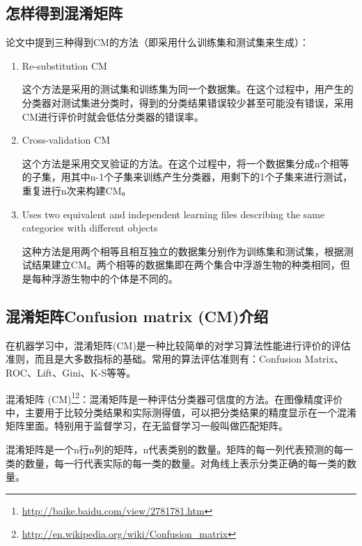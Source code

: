 \documentclass[12pt]{article}
\begin{document}
\subsection{怎样得到混淆矩阵}
论文中提到三种得到CM的方法（即采用什么训练集和测试集来生成）：
    \begin{enumerate}
        \item Re-substitution CM
        
       这个方法是采用的测试集和训练集为同一个数据集。在这个过程中，用产生的分类器对测试集进分类时，得到的分类结果错误较少甚至可能没有错误，采用CM进行评价时就会低估分类器的错误率。
        \item Cross-validation CM
        
        这个方法是采用交叉验证的方法。在这个过程中，将一个数据集分成n个相等的子集，用其中n-1个子集来训练产生分类器，用剩下的1个子集来进行测试，重复进行n次来构建CM。
        \item Uses two equivalent and independent learning files describing the same categories with different objects
        
        这种方法是用两个相等且相互独立的数据集分别作为训练集和测试集，根据测试结果建立CM。两个相等的数据集即在两个集合中浮游生物的种类相同，但是每种浮游生物中的个体是不同的。
    \end{enumerate}
    



\subsection{混淆矩阵Confusion matrix (CM)介绍}
\label{CM}

在机器学习中，混淆矩阵(CM)是一种比较简单的对学习算法性能进行评价的评估准则，而且是大多数指标的基础。常用的算法评估准则有：Confusion Matrix、ROC、Lift、Gini、K-S等等。\newline

混淆矩阵 (CM)\footnote{\url{http://baike.baidu.com/view/2781781.htm}}\footnote{\url{http://en.wikipedia.org/wiki/Confusion_matrix}}：混淆矩阵是一种评估分类器可信度的方法。在图像精度评价中，主要用于比较分类结果和实际测得值，可以把分类结果的精度显示在一个混淆矩阵里面。特别用于监督学习，在无监督学习一般叫做匹配矩阵。

混淆矩阵是一个n行n列的矩阵，n代表类别的数量。矩阵的每一列代表预测的每一类的数量，每一行代表实际的每一类的数量。对角线上表示分类正确的每一类的数量。
\end{document}
